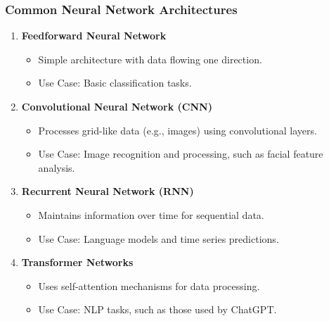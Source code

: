 \documentclass[aspectratio=169]{beamer}
\begin{document}
\begin{frame}[fragile]
    \frametitle{Common Neural Network Architectures}

    \begin{enumerate}
        \item \textbf{Feedforward Neural Network}
            \begin{itemize}
                \item Simple architecture with data flowing one direction.
                \item Use Case: Basic classification tasks.
            \end{itemize}
        \item \textbf{Convolutional Neural Network (CNN)}
            \begin{itemize}
                \item Processes grid-like data (e.g., images) using convolutional layers.
                \item Use Case: Image recognition and processing, such as facial feature analysis.
            \end{itemize}
        \item \textbf{Recurrent Neural Network (RNN)}
            \begin{itemize}
                \item Maintains information over time for sequential data.
                \item Use Case: Language models and time series predictions.
            \end{itemize}
        \item \textbf{Transformer Networks}
            \begin{itemize}
                \item Uses self-attention mechanisms for data processing.
                \item Use Case: NLP tasks, such as those used by ChatGPT.
            \end{itemize}
    \end{enumerate}
\end{frame}
\end{document}
